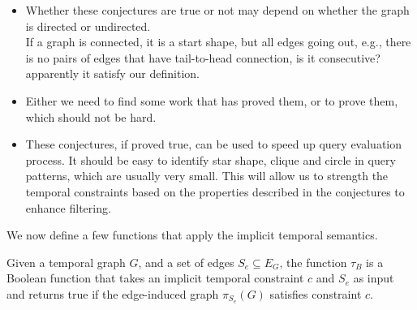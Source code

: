 \begin{itemize}
	\item Whether these conjectures are true or not may depend on whether
          the graph is directed or undirected.\\
          	If a graph is connected, it is a start shape, but all edges going out, e.g., there is no pairs of edges that have tail-to-head connection, is it consecutive? apparently it satisfy our definition. 
        
	\item Either we need to find some work that has proved them, or to prove
          them, which should not be hard.
	\item These conjectures, if proved true, can be used to speed up query
          evaluation process. It should be easy to identify star shape, clique
          and circle in query patterns, which are usually very small. This will
          allow us to strength the temporal constraints based on the properties
          described in the conjectures to enhance filtering.
\end{itemize}

We now define a few functions that apply the implicit temporal semantics. 

\begin{defn}
Given a temporal graph $G$, and a set of edges $S_e \subseteq E_G$, the function $\tau_B$ is a Boolean function that takes an implicit temporal constraint $c$ and $S_e$ as input and returns true if the edge-induced graph $\pi_{S_e}(G)$ satisfies constraint $c$.
\end{defn}


